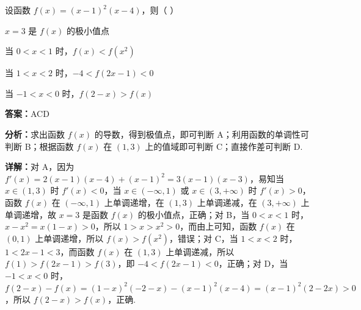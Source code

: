\begin{question}[points=6]
设函数 $f(x)=(x-1)^2(x-4)$，则（ ）
\begin{choices}
  \item $x=3$ 是 $f(x)$ 的极小值点
  \item 当 $0<x<1$ 时，$f(x)<f(x^2)$
  \item 当 $1<x<2$ 时，$-4<f(2x-1)<0$
  \item 当 $-1<x<0$ 时，$f(2-x)>f(x)$
\end{choices}
\begin{solution}
\textbf{答案：}ACD

\textbf{分析：}求出函数 $f(x)$ 的导数，得到极值点，即可判断 A；利用函数的单调性可判断 B；根据函数 $f(x)$ 在 $(1,3)$ 上的值域即可判断 C；直接作差可判断 D.

\textbf{详解：}对 A，因为 $f'(x)=2(x-1)(x-4)+(x-1)^2=3(x-1)(x-3)$，易知当 $x\in(1,3)$ 时 $f'(x)<0$，当 $x\in(-\infty,1)$ 或 $x\in(3,+\infty)$ 时 $f'(x)>0$，函数 $f(x)$ 在 $(-\infty,1)$ 上单调递增，在 $(1,3)$ 上单调递减，在 $(3,+\infty)$ 上单调递增，故 $x=3$ 是函数 $f(x)$ 的极小值点，正确；对 B，当 $0<x<1$ 时，$x-x^2=x(1-x)>0$，所以 $1>x>x^2>0$，而由上可知，函数 $f(x)$ 在 $(0,1)$ 上单调递增，所以 $f(x)>f(x^2)$，错误；对 C，当 $1<x<2$ 时，$1<2x-1<3$，而函数 $f(x)$ 在 $(1,3)$ 上单调递减，所以 $f(1)>f(2x-1)>f(3)$，即 $-4<f(2x-1)<0$，正确；对 D，当 $-1<x<0$ 时，$f(2-x)-f(x)=(1-x)^2(-2-x)-(x-1)^2(x-4)=(x-1)^2(2-2x)>0$，所以 $f(2-x)>f(x)$，正确.
\end{solution}
\end{question}

